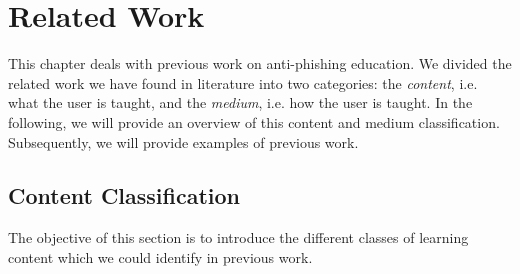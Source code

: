 
\section{Related Work}
\label{s:related_work}

This chapter deals with previous work on anti-phishing education.
 We divided the related work we have found in literature into two categories: the \textit{content}, i.e.
 what the user is taught, and the 
\textit{medium}, i.e. how the user is taught.
 In the following, we will provide an overview of this content and medium classification.
 Subsequently, we will provide examples of previous work.


\subsection{Content Classification}
The objective of this section is to introduce the different classes of learning content which we could identify in previous work.

